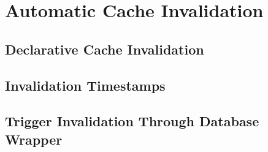 \chapter{Automatic Cache Invalidation}
\label{chapter:invalidation}


\section{Declarative Cache Invalidation}
\label{sec:declarative-cache-invalidation}


\section{Invalidation Timestamps}
\label{sec:invalidation-timestamps}



\section{Trigger Invalidation Through Database Wrapper}
\label{sec:trigger-invalidation-through-database-wrapper}



